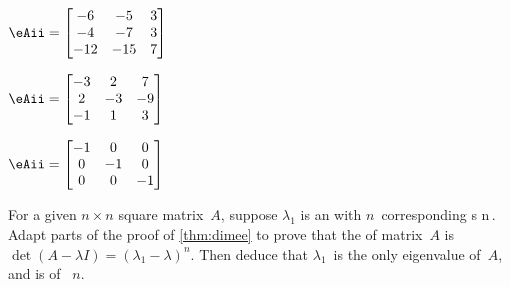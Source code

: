 \begin{exercise}
\begin{Parts}
\begin{OmitV1}
\item \(\eAii=\begin{bmatrix} -6 & -5 & 3
\\-4 & -7 & 3
\\-12 & -15 & 7 \end{bmatrix}\)
\end{OmitV1}

\item \(\eAii=\begin{bmatrix} -3 & 2 & 7
\\2 & -3 & -9
\\-1 & 1 & 3 \end{bmatrix}\)

\item \(\eAii=\begin{bmatrix} -1 & 0 & 0
\\0 & -1 & 0
\\0 & 0 & -1 \end{bmatrix}\)


\end{Parts}
\end{exercise}







\begin{exercise} \label{ex:dimme} 
For a given \(n\times n\) square matrix~\(A\), suppose \(\lambda_1\) is an  with \(n\)~corresponding  s \hlist\pv n\,.  
Adapt parts of the proof of \cref{thm:dimee} to prove that the  of matrix~\(A\) is \(\det(A-\lambda I)=(\lambda_1-\lambda)^n\). 
Then deduce that \(\lambda_1\)~is the only eigenvalue of~\(A\), and is of ~\(n\).
\end{exercise}




